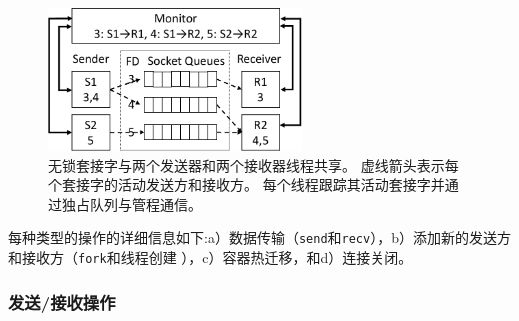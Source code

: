 \begin{figure}[htbp]
	\centering
	\includegraphics[width=0.6\textwidth]{images/queue_arch}
	\caption{无锁套接字与两个发送器和两个接收器线程共享。 虚线箭头表示每个套接字的活动发送方和接收方。 每个线程跟踪其活动套接字并通过独占队列与管程通信。}
	\label{socksdirect:fig:queue-arch}
\end{figure}



每种类型的操作的详细信息如下:a）数据传输（\texttt {send}和\texttt {recv}），b）添加新的发送方和接收方（\texttt {fork}和线程创建 ），c）容器热迁移，和d）连接关闭。

\subsubsection{发送/接收操作}
\label{socksdirect:subsubsec:fork_rdwr}

